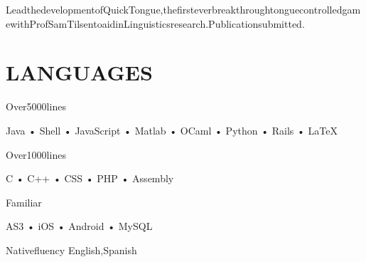 \begin{paracol}{2}
\begin{leftcolumn}
\begin{minipage}{\dimexpr\linewidth-2\fboxsep\relax}
\endgroup
\begingroup
{}
\begin{tightnopoints}\item{Lead{\space}the{\space}development{\space}of{\space}QuickTongue,{\space}the{\space}first{\space}ever{\space}breakthrough{\space}tongue\-controlled{\space}game{\space}with{\space}Prof{\space}Sam{\space}Tilsen{\space}to{\space}aid{\space}in{\space}Linguistics{\space}research.{\space}Publication{\space}submitted.}\end{tightnopoints}
\endgroup
\endgroup
\sectionseperator%
\end{minipage} 
\noindent\begin{minipage}{\textwidth}
%
\sloppy
\begingroup
\sectionseperator%
\raggedright\section{LANGUAGES}
\setlength{\multicolsep}{0pt}%
\begin{multicols}{2}
\begingroup
\begin{minipage}[t]{\columnwidth}
{
\begingroup
\begin{tightnopoints}
\item{{Over{\space}5000{\space}lines\:}}
\end{tightnopoints}
Java • Shell • JavaScript • Matlab • OCaml • Python • Rails • LaTeX
\newline
\begin{tightnopoints}
\item{{Over{\space}1000{\space}lines\:}}
\end{tightnopoints}
C • C++ • CSS • PHP • Assembly
\newline
\begin{tightnopoints}
\item{{Familiar\:}}
\end{tightnopoints}
AS3 • iOS • Android • MySQL
\newline
\endgroup}
\end{minipage}
\endgroup
\begingroup
\begin{minipage}[t]{\columnwidth}
{
\begingroup
\begin{tightnopoints}
\item{{Native{\space}fluency\:{\space}}} {{English,{\space}Spanish}}

\end{tightnopoints}}
\end{minipage}
\end{multicols}
\end{minipage}
\end{leftcolumn}
\end{paracol}
